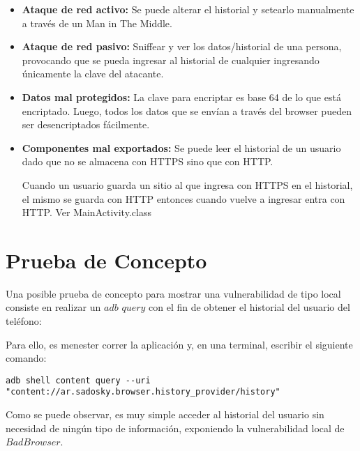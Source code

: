 \documentclass[10pt, a4paper]{article}
\begin{document}
\begin{itemize}
\item \textbf{Ataque de red activo:} Se puede alterar el historial y setearlo manualmente a través de un Man in The Middle.

\item \textbf{Ataque de red pasivo:} Sniffear y ver los datos/historial de una persona, provocando que se pueda ingresar al historial de cualquier ingresando únicamente la clave del atacante.

\item \textbf{Datos mal protegidos:} La clave para encriptar es base 64 de lo que está encriptado. Luego, todos los datos que se envían a través del browser pueden ser desencriptados fácilmente. 

\item \textbf{Componentes mal exportados:} Se puede leer el historial de un usuario dado que no se almacena con HTTPS sino que con HTTP.

Cuando un usuario guarda un sitio al que ingresa con HTTPS en el historial, el mismo se guarda con HTTP entonces cuando vuelve a ingresar entra con HTTP. Ver MainActivity.class

\end{itemize}

\newpage
\section{Prueba de Concepto}

Una posible prueba de concepto para mostrar una vulnerabilidad de tipo local consiste en realizar un $adb$ $query$ con el fin de obtener el historial del usuario del teléfono:

Para ello, es menester correr la aplicación y, en una terminal, escribir el siguiente comando:

\begin{verbatim}
adb shell content query --uri "content://ar.sadosky.browser.history_provider/history"
\end{verbatim}

Como se puede observar, es muy simple acceder al historial del usuario sin necesidad de ningún tipo de información, exponiendo la vulnerabilidad local de $BadBrowser$.
\end{document}
